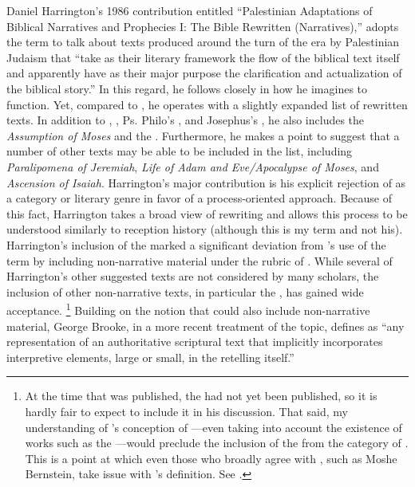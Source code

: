 Daniel Harrington's 1986 contribution entitled ``Palestinian Adaptations of Biblical Narratives and Prophecies I: The Bible Rewritten (Narratives),'' adopts the term \rwb to talk about texts produced around the turn of the era by Palestinian Judaism that ``take as their literary framework the flow of the biblical text itself and apparently have as their major purpose the clarification and actualization of the biblical story.''%
    \autocite[239]{harrington_kraft-nickelsburg1986}
In this regard, he follows \vermes closely in how he imagines \rwb to function. Yet, compared to \vermes, he operates with a slightly expanded list of rewritten texts. In addition to \jub, \ga, Ps. Philo's \lab, and Josephus's \ant, he also includes the \emph{Assumption of Moses} and the \templescroll. Furthermore, he makes a point to suggest that a number of other texts may be able to be included in the list, including \emph{Paralipomena of Jeremiah}, \emph{Life of Adam and Eve/Apocalypse of Moses}, and \emph{Ascension of Isaiah}. Harrington's major contribution is his explicit rejection of \rwb as a category or literary genre in favor of a process-oriented approach. Because of this fact, Harrington takes a broad view of rewriting and allows this process to be understood similarly to reception history (although this is my term and not his). Harrington's inclusion of the \templescroll marked a significant deviation from \vermes's use of the term by including non-narrative material under the rubric of \rwb. While several of Harrington's other suggested texts are not considered \rwb by many scholars, the inclusion of other non-narrative texts, in particular the \templescroll, has gained wide acceptance.%
    \footnote{%
        At the time that  was published, the \templescroll had not yet been published, so it is hardly fair to expect \vermes to include it in his discussion. That said, my understanding of \vermes's conception of \rwb---even taking into account the existence of works such as the \templescroll---would preclude the inclusion of the \templescroll from the category of \rwb. This is a point at which even those who broadly agree with \vermes, such as Moshe Bernstein, take issue with \vermes's definition. See 
        \cite[183--184]{bernstein_textus2005}.}
%
Building on the notion that \rwb could also include non-narrative material, George Brooke, in a more recent treatment of the topic, defines \rwb as ``any representation of an authoritative scriptural text that implicitly incorporates interpretive elements, large or small, in the retelling itself.''%
